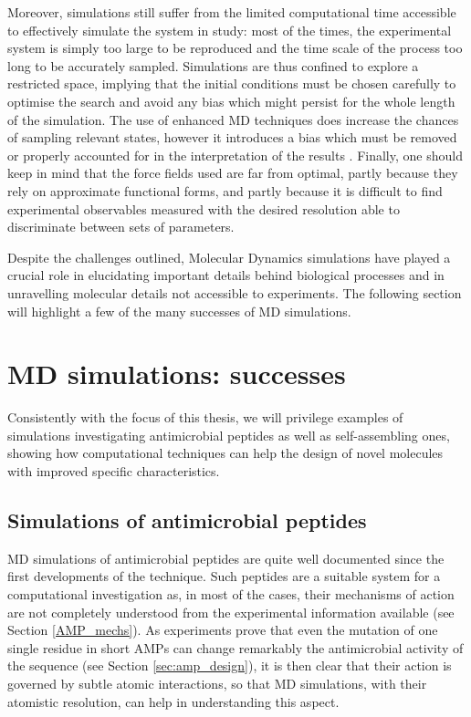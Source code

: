 Moreover, simulations still suffer from the limited computational time accessible to effectively simulate the system in study: most of the times, the experimental system is simply too large to be reproduced and the time scale of the process too long to be accurately sampled. Simulations are thus confined to explore a restricted space, implying that the initial conditions must be chosen carefully to optimise the search and avoid any bias which might persist for the whole length of the simulation. The use of enhanced MD techniques does increase the chances of sampling relevant states, however it introduces a bias which must be removed or properly accounted for in the interpretation of the results \citep{Bernardi2015,Best2005,Barducci2010,Barducci2011,Mills2008}.
Finally, one should keep in mind that the force fields used are far from optimal, partly because they rely on approximate functional forms, and partly because it is difficult to find experimental observables measured with the desired resolution able to discriminate between sets of parameters.

Despite the challenges outlined, Molecular Dynamics simulations have played a crucial role in elucidating important details behind biological processes and in unravelling molecular details not accessible to experiments. The following section will highlight a few of the many successes of MD simulations.


\section{MD simulations: successes} \label{sec:md_lit}
Consistently with the focus of this thesis, we will privilege examples of simulations investigating antimicrobial peptides as well as self-assembling ones, showing how computational techniques can help the design of novel molecules with improved specific characteristics.

\subsection{Simulations of antimicrobial peptides}
MD simulations of antimicrobial peptides are quite well documented since the first developments of the technique. Such peptides are a suitable system for a computational investigation as, in most of the cases, their mechanisms of action are not completely understood from the experimental information available (see Section \ref{AMP_mechs}). As experiments prove that even the mutation of one single residue in short AMPs can change remarkably the antimicrobial activity of the sequence (see Section \ref{sec:amp_design}), it is then clear that their action is governed by subtle atomic interactions, so that MD simulations, with their atomistic resolution, can help in understanding this aspect.

